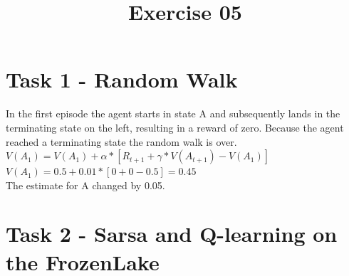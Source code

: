 \documentclass[a4paper]{article}
\date{}
\author{}
\title{\textbf{Exercise 05}}
\begin{document}
	\maketitle 
	\thispagestyle{fancy}
    \section*{Task 1 - Random Walk}
    In the first episode the agent starts in state A and subsequently lands in the terminating state on the left, resulting in a reward of zero. Because the agent reached a terminating state the random walk is over. \\

    $V(A_1) = V(A_1) + \alpha * [R_{t+1} + \gamma*V(A_{t+1})-V(A_1)]$ \\
    
    $V(A_1) = 0.5 + 0.01 * [0 + 0 - 0.5] = 0.45$ \\
    
    The estimate for A changed by 0.05.\\
    
    \section*{Task 2 - Sarsa and Q-learning on the FrozenLake}
\end{document}
